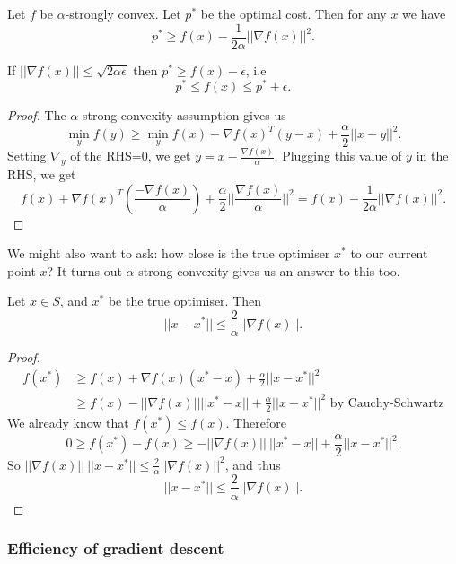 \documentclass[egregdoesnotlikesansseriftitles,a4paper]{scrartcl}
\begin{document}
\begin{proposition}
	Let $f$ be $\alpha$-strongly convex. Let $p^*$ be the optimal cost. Then for any $x$ we have \[p^* \geq f(x)-\frac{1}{2\alpha}||\nabla f(x)||^2.\]
\end{proposition}
\begin{remark}
	If $||\nabla f (x)||\leq \sqrt{2\alpha \epsilon}$ then $p^* \geq f(x)-\epsilon$, i.e 
	\[p^* \leq f (x) \leq p^*+ \epsilon.\]
	
\end{remark}
\begin{proof}
	 The $\alpha$-strong convexity assumption gives us 
	 \[\min_y f(y)\geq \min_y f (x)+ \nabla f (x)^T (y-x)+\frac{\alpha}{2}||x-y||^2.\]
	 Setting $\nabla_y$ of the RHS=0, we get $y=x-\frac{\nabla f (x)}{\alpha}.$\newline 
	 Plugging this value of $y$ in the RHS, we get 
	 \[f(x)+\nabla f(x)^T (\frac{-\nabla f (x)}{\alpha})+\frac{\alpha}{2}||\frac{\nabla f(x)}{\alpha}||^2=f (x)- \frac{1}{2\alpha}||\nabla f (x)||^2.\]
	 
\end{proof}

We might also want to ask: how close is the true optimiser $x^*$ to our current point $x$? It turns out $\alpha$-strong convexity gives us an answer to this too.

\begin{proposition}
	Let $x \in S$, and $x^*$ be the true optimiser. Then
	\[||x-x^*||\leq \frac{2}{\alpha}||\nabla f (x)||.\]
	
\end{proposition}
\begin{proof}
	 \begin{equation*}
		  \begin{split}
			  f(x^*)&\geq f(x)+\nabla f(x)(x^*-x)+ \frac{\alpha}{2}||x-x^*||^2\\
			  &\geq f(x)-||\nabla f(x)||||x^*-x||+\frac{\alpha}{2}||x-x^*||^2 \text{ by Cauchy-Schwartz} 
		  \end{split}
	 \end{equation*}
	We already know that $f (x^*)\leq f (x)$. Therefore 
	\[0 \geq f (x^*)-f (x)\geq -||\nabla f (x)|| \ ||x^*-x||+ \frac{\alpha}{2}||x-x^*||^2.\]
	So $||\nabla f (x)||\ ||x-x^*||\leq \frac{2}{\alpha}||\nabla f (x)||^2$, and thus 
	\[||x-x^*||\leq \frac{2}{\alpha}||\nabla f (x)||.\]
	
\end{proof}
\subsubsection{Efficiency of gradient descent}
\end{document}
